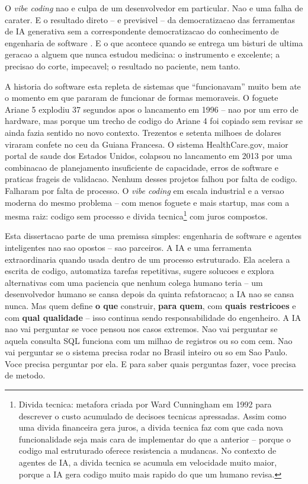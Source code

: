 \documentclass[12pt,a4paper,oneside,sumario=tradicional,chapter=TITLE,section=TITLE,subsection=TITLE,english,brazil]{abntex2}
\begin{document}
O \textit{vibe coding} nao e culpa de um desenvolvedor em particular. Nao e uma falha de carater. E o resultado direto -- e previsivel -- da democratizacao das ferramentas de IA generativa sem a correspondente democratizacao do conhecimento de engenharia de software \cite{macedo2026engenharia}. E o que acontece quando se entrega um bisturi de ultima geracao a alguem que nunca estudou medicina: o instrumento e excelente; a precisao do corte, impecavel; o resultado no paciente, nem tanto.

A historia do software esta repleta de sistemas que ``funcionavam'' muito bem ate o momento em que pararam de funcionar de formas memoraveis. O foguete Ariane 5 explodiu 37 segundos apos o lancamento em 1996 -- nao por um erro de hardware, mas porque um trecho de codigo do Ariane 4 foi copiado sem revisar se ainda fazia sentido no novo contexto. Trezentos e setenta milhoes de dolares viraram confete no ceu da Guiana Francesa. O sistema HealthCare.gov, maior portal de saude dos Estados Unidos, colapsou no lancamento em 2013 por uma combinacao de planejamento insuficiente de capacidade, erros de software e praticas frageis de validacao. Nenhum desses projetos falhou por falta de codigo. Falharam por falta de processo. O \textit{vibe coding} em escala industrial e a versao moderna do mesmo problema -- com menos foguete e mais startup, mas com a mesma raiz: codigo sem processo e divida tecnica\footnote{Divida tecnica: metafora criada por Ward Cunningham em 1992 para descrever o custo acumulado de decisoes tecnicas apressadas. Assim como uma divida financeira gera juros, a divida tecnica faz com que cada nova funcionalidade seja mais cara de implementar do que a anterior -- porque o codigo mal estruturado oferece resistencia a mudancas. No contexto de agentes de IA, a divida tecnica se acumula em velocidade muito maior, porque a IA gera codigo muito mais rapido do que um humano revisa.} com juros compostos.

Esta dissertacao parte de uma premissa simples: engenharia de software e agentes inteligentes nao sao opostos -- sao parceiros. A IA e uma ferramenta extraordinaria quando usada dentro de um processo estruturado. Ela acelera a escrita de codigo, automatiza tarefas repetitivas, sugere solucoes e explora alternativas com uma paciencia que nenhum colega humano teria -- um desenvolvedor humano se cansa depois da quinta refatoracao; a IA nao se cansa nunca. Mas quem define \textbf{o que} construir, \textbf{para quem}, com \textbf{quais restricoes} e com \textbf{qual qualidade} -- isso continua sendo responsabilidade do engenheiro. A IA nao vai perguntar se voce pensou nos casos extremos. Nao vai perguntar se aquela consulta SQL funciona com um milhao de registros ou so com cem. Nao vai perguntar se o sistema precisa rodar no Brasil inteiro ou so em Sao Paulo. Voce precisa perguntar por ela. E para saber quais perguntas fazer, voce precisa de metodo.
\end{document}
